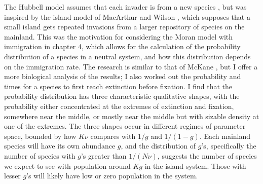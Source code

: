 The Hubbell model assumes that each invader is from a new species \cite{Hubbell2001}, but was inspired by the island model of MacArthur and Wilson \cite{MacArthur1967a}, which supposes that a small island gets repeated invasions from a larger repository of species on the mainland. 
This was the motivation for considering the Moran model with immigration in chapter 4, which allows for the calculation of the probability distribution of a species in a neutral system, and how this distribution depends on the immigration rate. %
The research is similar to that of McKane \cite{McKane2004}, but I offer a more biological analysis of the results; I also worked out the probability and times for a species to first reach extinction before fixation. %
I find that the probability distribution has three characteristic qualitative shapes, with the probability either concentrated at the extremes of extinction and fixation, somewhere near the middle, or mostly near the middle but with sizable density at one of the extremes. 
The three shapes occur in different regimes of parameter space, bounded by how $K\nu$ compares with $1/g$ and $1/(1-g)$. 
Each mainland species will have its own abundance $g$, and the distribution of $g$'s, specifically the number of species with $g$'s greater than $1/(N\nu)$, suggests the number of species we expect to see with population around $K g$ in the island system. 
Those with lesser $g$'s will likely have low or zero population in the system. 



